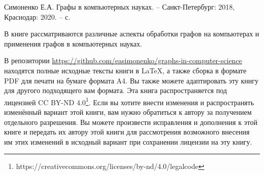 
Симоненко Е.А. Графы в компьютерных науках. – Санкт-Петербург: 2018, Краснодар: 2020. 
– \pageref{LastPage} с.

В книге рассматриваются различные аспекты обработки графов на компьютерах и 
применения графов в компьютерных науках.

В репозитории \url{https://github.com/easimonenko/graphs-in-computer-science} 
находятся полные исходные тексты книги в \LaTeX, а также сборка в формате PDF 
для печати на бумаге формата A4. Вы также можете адаптировать эту книгу для 
другого подходящего вам формата. Эта книга распространяется под 
лицензией {CC BY-ND 4.0}\footnote{https://creativecommons.org/licenses/by-nd/4.0/legalcode}. Если вы хотите внести изменения и распространять изменённый вариант 
этой книги, вам нужно обратиться к автору за получением отдельного разрешения. 
Вы можете произвести исправления и дополнения к этой книге и передать их автору 
этой книги для рассмотрения возможного внесения им этих изменений в исходный 
вариант при сохранении лицензии на эту книгу.
